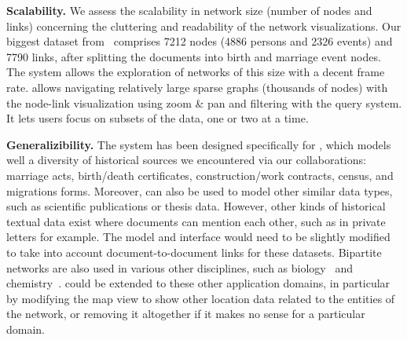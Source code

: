 \noindent\textbf{Scalability.} We assess the scalability in network size (number of nodes and links) concerning the cluttering and readability of the network visualizations. Our biggest dataset from \zacarias\ comprises 7212 nodes (4886 persons and 2326 events) and 7790 links, after splitting the documents into birth and marriage event nodes. The system allows the exploration of networks of this size with a decent frame rate.
\name allows navigating relatively large sparse graphs (thousands of nodes) with the node-link visualization using zoom \& pan and filtering with the query system. It lets users focus on subsets of the data, one or two at a time.

\noindent\textbf{Generalizibility.} The system has been designed specifically for \modelplural, which models well a diversity of historical sources we encountered via our collaborations: marriage acts, birth/death certificates, construction/work contracts, census, and migrations forms.
Moreover, \model can also be used to model other similar data types, such as scientific publications or thesis data.
However, other kinds of historical textual data exist where documents can mention each other, such as in private letters for example.
The model and interface would need to be slightly modified to take into account document-to-document links for these datasets.
Bipartite networks are also used in various other disciplines, such as biology~\cite{klamt2009hypergraphs} and chemistry~\cite{konstantinovaApplicationHypergraphTheory2001}. \name could be extended to these other application domains, in particular by modifying the map view to show other location data related to the entities of the network, or removing it altogether if it makes no sense for a particular domain.



